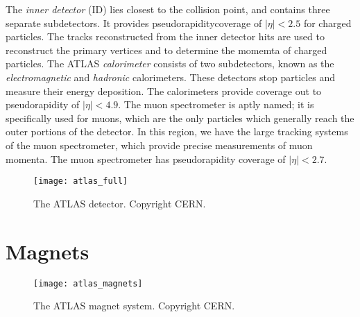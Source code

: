 The \textit{inner detector} (ID) lies closest to the collision point, and contains three separate subdetectors.
It provides pseudorapidity\footnotemark coverage of $|\eta| < 2.5$ for charged particles.
The tracks reconstructed from the inner detector hits are used to reconstruct the primary vertices and to determine the momemta of charged particles.
The ATLAS \textit{calorimeter} consists of two subdetectors, known as the \textit{electromagnetic} and \textit{hadronic} calorimeters.
These detectors stop particles and measure their energy deposition.
The calorimeters provide coverage out to pseudorapidity of $|\eta| < 4.9$.
The muon spectrometer is aptly named; it is specifically used for muons, which are the only particles which generally reach the outer portions of the detector.
In this region, we have the large tracking systems of the muon spectrometer, which provide precise measurements of muon momenta.
The muon spectrometer has pseudorapidity coverage of $|\eta| < 2.7$.

\begin{figure}
\caption{The ATLAS detector. Copyright CERN.} \label{fig:atlas_full}
\texttt{[image: atlas\_full]}
\end{figure}

\section{Magnets}

\begin{figure}
\caption{The ATLAS magnet system. Copyright CERN.} \label{fig:atlas_magnets}
\texttt{[image: atlas\_magnets]}
\end{figure}

